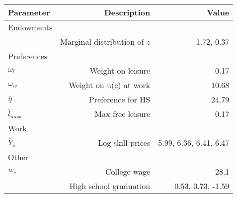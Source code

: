 \begin{tabular}{lrr}
\hline
Parameter & Description  & Value  \\ 
\hline
Endowments &   &   \\ 
 & Marginal distribution of $z$  & 1.72, 0.37  \\ 
Preferences &   &   \\ 
$\omega_{l}$ & Weight on leisure  & 0.17  \\ 
$\omega_{w}$ & Weight on u(c) at work  & 10.68  \\ 
$\bar{\eta}$ & Preference for HS  & 24.79  \\ 
$\bar{l}_{max}$ & Max free leisure  & 0.17  \\ 
Work &   &   \\ 
$\bar{Y}_{s}$ & Log skill prices  & 5.99, 6.36, 6.41, 6.47  \\ 
Other &   &   \\ 
$w_{c}$ & College wage  & 28.1  \\ 
 & High school graduation  & 0.53, 0.73, -1.59  \\ 
\hline
\end{tabular}%
